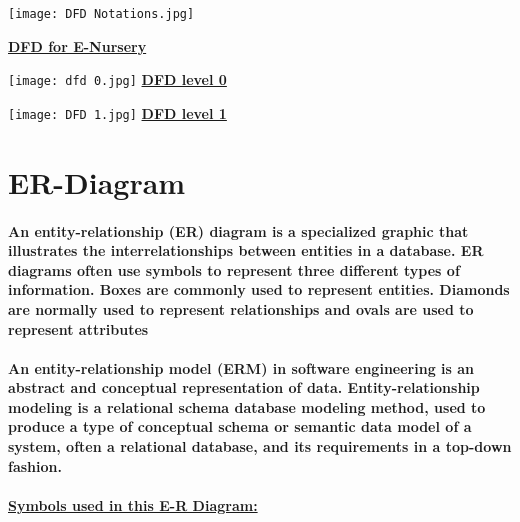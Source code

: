 \documentclass[12pt]{report}
\begin{document}
        
        \begin{center}
        \texttt{[image: DFD Notations.jpg]}    
        \end{center}
        
        \pagebreak
        \begin{center}
            \textbf{\underline{\large{DFD for E-Nursery}}}
        \end{center}
        \begin{center}
            \texttt{[image: dfd 0.jpg]}  
            \textbf{\underline{DFD level 0}}
        \end{center}
        
        \pagebreak
        \begin{center}
            \texttt{[image: DFD 1.jpg]}
            \textbf{\underline{DFD level 1}}
        \end{center}
        \pagebreak
        \section{ER-Diagram}
        \paragraph
        {
        An entity-relationship (ER) diagram is a specialized graphic that illustrates the interrelationships between entities in a database. ER diagrams often use symbols to represent three different types of information. Boxes are commonly used to represent entities. Diamonds are normally used to represent relationships and ovals are used to represent attributes
        }
        \paragraph
        {
        An \textbf{entity-relationship model} (ERM) in software engineering is an abstract and conceptual representation of data. Entity-relationship modeling is a relational schema database modeling method, used to produce a type of conceptual schema or semantic data model of a system, often a relational database, and its requirements in a top-down fashion.
        }
        
        \paragraph
        {
        \textbf{\underline{Symbols used in this E-R Diagram:}}
        }
        
\end{document}
